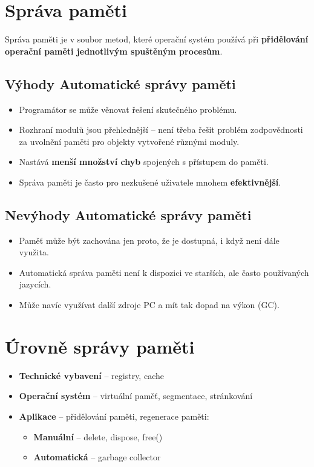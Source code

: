 \section{Správa paměti}
Správa paměti je v soubor metod, které operační systém používá při \textbf{přidělování operační paměti jednotlivým spuštěným procesům}.

\subsection*{Výhody Automatické správy paměti}
\begin{itemize}
    \item Programátor se může věnovat řešení skutečného problému.
    \item Rozhraní modulů jsou přehlednější -- není třeba řešit problém zodpovědnosti za uvolnění paměti pro objekty vytvořené různými moduly.
    \item Nastává \textbf{menší množství chyb} spojených s přístupem do paměti.
    \item Správa paměti je často pro nezkušené uživatele mnohem \textbf{efektivnější}.
\end{itemize}

\subsection*{Nevýhody Automatické správy paměti}
\begin{itemize}
    \item Paměť může být zachována jen proto, že je dostupná, i když není dále využita.
    \item Automatická správa paměti není k dispozici ve starších, ale často používaných jazycích.
    \item Může navíc využívat další zdroje PC a mít tak dopad na výkon (GC).
\end{itemize}

\section{Úrovně správy paměti}
\begin{itemize}
    \item \textbf{Technické vybavení} -- registry, cache
    \item \textbf{Operační systém} -- virtuální paměť, segmentace, stránkování
    \item \textbf{Aplikace} -- přidělování paměti, regenerace paměti:
          \begin{itemize}
              \item \textbf{Manuální} -- delete, dispose, free()
              \item \textbf{Automatická} -- garbage collector
          \end{itemize}
\end{itemize}

